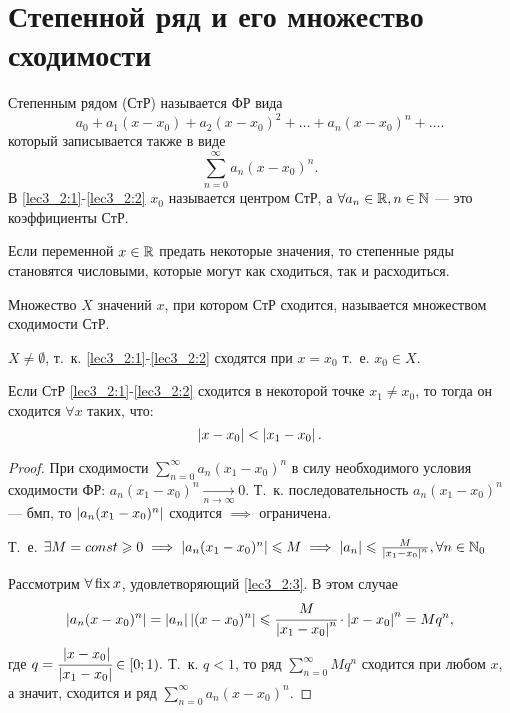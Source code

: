 \documentclass[../../main.tex]{subfiles}
\begin{document}
\section{Степенной ряд и его множество сходимости}

Степенным рядом (СтР) называется ФР вида
\begin{equation}\label{lec3_2:1}
a_0+a_1(x-x_0)+a_2(x-x_0)^2+\dots+a_n(x-x_0)^n+\dots.
\end{equation}
который записывается также в виде
\begin{equation}\label{lec3_2:2}
\sum_{n=0}^{\infty}a_n(x-x_0)^n.
\end{equation}
В \eqref{lec3_2:1}-\eqref{lec3_2:2} $x_0$ называется центром СтР, 
а $\forall a_n \in \mathbb{R}, n\in \mathbb{N}$ --- это коэффициенты СтР.

Если переменной $x\in\mathbb{R}$ предать некоторые значения, 
то степенные ряды становятся числовыми, которые могут как сходиться, 
так и расходиться.

Множество $X$ значений $x$, при котором СтР сходится, 
называется множеством сходимости СтР. 

$X \neq \emptyset$, т.~к. \eqref{lec3_2:1}-\eqref{lec3_2:2} 
сходятся при $x=x_0$ т.~е. $x_0\in X$.

\begin{lem}
	Если СтР \eqref{lec3_2:1}-\eqref{lec3_2:2} сходится в некоторой 
	точке $x_1\neq x_0$, то тогда он сходится $\forall x$ таких, что:
	\begin{equation}\label{lec3_2:3}
		 \left|{ x - x_0}\right| < \left|{x_1 - x_0}\right|.
	\end{equation}
\end{lem}
\begin{proof}
	При сходимости $\sum\limits_{n=0}^{\infty}a_n(x_1-x_0)^n$ 
	в силу необходимого
	условия сходимости ФР: $a_n(x_1-x_0)^n\underset{n\to\infty}{\rightarrow}0$. 
	Т.~к. последовательность $a_n(x_1-x_0)^n$ --- бмп, 
	то $\left|{a_n(x_1-x_0)^n}\right|$ сходится $\implies$ ограничена.
	
	Т.~е. $\exists M=const \geqslant0 \implies \left|{a_n(x_1-x_0)^n}\right| \leqslant M
	\implies \left|{a_n}\right|\leqslant \frac{M}{\left|{x_1-x_0}\right|^n}, \forall n\in\mathbb{N}_0$
	
	Рассмотрим $\forall \operatorname{fix} x $, удовлетворяющий \eqref{lec3_2:3}. 
	В этом случае  
	\begin{equation*}
		\left|{a_n(x-x_0)^n}\right| = \left|{a_n}\right|\left|{(x-x_0)^n}\right|\leqslant 
		\cfrac{M}{\left|{x_1-x_0}\right|^n}\cdot \left|{x-x_0}\right|^n=Mq^n,
	\end{equation*}
	где $q=\cfrac{\left|{x-x_0}\right|}{\left|{x_1-x_0}\right|}\in{\left[0;1\right)}.$ Т.~к. $q < 
	1$, то ряд $\sum\limits_{n=0}^{\infty} 
	Mq^n$ сходится при любом $x$, а значит, 
	сходится и ряд $\sum\limits_{n=0}^{\infty} a_n(x-x_0)^n$.
\end{proof}	
\end{document}
